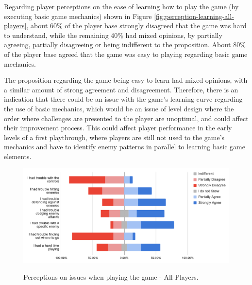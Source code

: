 Regarding player perceptions on the ease of learning how to play the game (by executing basic game mechanics) shown in Figure \ref{fig:perception-learning-all-players}, about 60\% of the player base strongly disagreed that the game was hard to understand, while the remaining 40\% had mixed opinions, by partially agreeing, partially disagreeing or being indifferent to the proposition. About 80\% of the player base agreed that the game was easy to playing regarding basic game mechanics.

The proposition regarding the game being easy to learn had mixed opinions, with a similar amount of strong agreement and disagreement. Therefore, there is an indication that there could be an issue with the game's learning curve regarding the use of basic mechanics, which would be an issue of level design where the order where challenges are presented to the player are unoptimal, and could affect their improvement process. This could affect player performance in the early levels of a first playthrough, where players are still not used to the game's mechanics and have to identify enemy patterns in parallel to learning basic game elements.

\begin{figure}[!ht]
    \begin{center}
    \caption{Perceptions on issues when playing the game - All Players.}
        \includegraphics[width=36em]{figures/fig-perception-troubles-all-players.png}
        \label{fig:perception-troubles-all-players}
    \end{center}
\end{figure}

